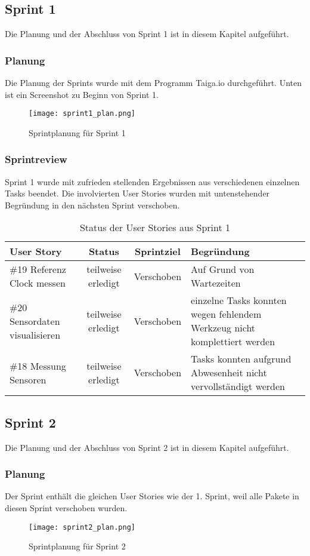\subsection*{Sprint 1}
Die Planung und der Abschluss von Sprint 1 ist in diesem Kapitel aufgeführt.
\subsubsection*{Planung}
Die Planung der Sprints wurde mit dem Programm Taiga.io durchgeführt. Unten ist ein Screenshot zu Beginn von Sprint 1.
    \begin{figure}[H]
        \centering
        \texttt{[image: sprint1\_plan.png]}
        \caption{Sprintplanung für Sprint 1}
    \end{figure}
\subsubsection*{Sprintreview}
    Sprint 1 wurde mit zufrieden stellenden Ergebnissen aus verschiedenen einzelnen Tasks beendet. Die involvierten User Stories wurden mit untenstehender Begründung in den nächsten Sprint verschoben.
    \begin{table}[H]
        \centering
        \begin{tabular}{lccp{7cm}}
            \textbf{User Story} &  \textbf{Status} & \textbf{Sprintziel}& \textbf{Begründung}\\\toprule[2pt]
            \#19 Referenz Clock messen & teilweise erledigt & Verschoben & Auf Grund von Wartezeiten\\
            \#20 Sensordaten visualisieren & teilweise erledigt & Verschoben & einzelne Tasks konnten wegen fehlendem Werkzeug nicht komplettiert werden\\
            \#18 Messung Sensoren & teilweise erledigt & Verschoben & Tasks konnten aufgrund Abwesenheit nicht vervollständigt werden\\
        \end{tabular}
        \caption{Status der User Stories aus Sprint 1}
    \end{table}

\clearpage
\subsection*{Sprint 2}
Die Planung und der Abschluss von Sprint 2 ist in diesem Kapitel aufgeführt.
\subsubsection*{Planung}
Der Sprint enthält die gleichen User Stories wie der 1. Sprint, weil alle Pakete in diesen Sprint verschoben wurden.
\begin{figure}[H]
    \centering
    \texttt{[image: sprint2\_plan.png]}
    \caption{Sprintplanung für Sprint 2}
\end{figure}
